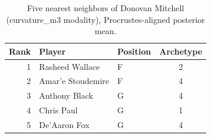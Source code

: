 \begin{table}[htbp]
  \centering\small
  \begin{tabular}{rllc}
    \toprule
    Rank & Player & Position & Archetype \\
    \midrule
    1 & Rasheed Wallace & F & 2 \\
    2 & Amar'e Stoudemire & F & 4 \\
    3 & Anthony Black & G & 4 \\
    4 & Chris Paul & G & 1 \\
    5 & De'Aaron Fox & G & 4 \\
    \bottomrule
  \end{tabular}
  \caption{Five nearest neighbors of Donovan Mitchell (curvature_m3 modality), Procrustes-aligned posterior mean.}
  \label{tab:Donovan_Mitchell_neighbors_curvature_m3}
\end{table}

